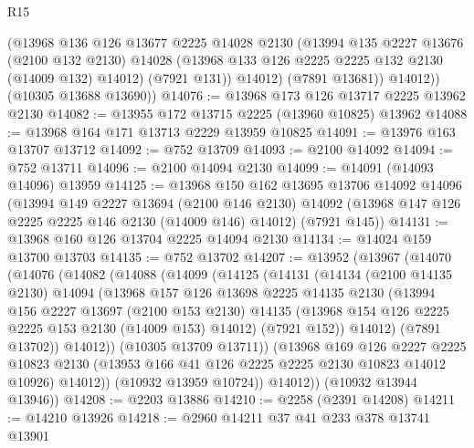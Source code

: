 \begin{lexlean}{R15}
\begin{coremodule}
            (@13968
              @136
              @126
              @13677
              @2225
              @14028
              @2130
              (@13994
                @135
                @2227
                @13676
                (@2100 @132 @2130)
                @14028
                (@13968 @133 @126 @2225 @2225 @132 @2130 (@14009 @132) @14012)
                (@7921 @131))
              @14012)
            (@7891 @13681))
          @14012))
      (@10305 @13688 @13690))
@14076 := @13968 @173 @126 @13717 @2225 @13962 @2130
@14082 := @13955 @172 @13715 @2225 (@13960 @10825) @13962
@14088 := @13968 @164 @171 @13713 @2229 @13959 @10825
@14091 := @13976 @163 @13707 @13712
@14092 := @752 @13709
@14093 := @2100 @14092
@14094 := @752 @13711
@14096 := @2100 @14094 @2130
@14099 := @14091 (@14093 @14096) @13959
@14125 := @13968
    @150
    @162
    @13695
    @13706
    @14092
    @14096
    (@13994
      @149
      @2227
      @13694
      (@2100 @146 @2130)
      @14092
      (@13968 @147 @126 @2225 @2225 @146 @2130 (@14009 @146) @14012)
      (@7921 @145))
@14131 := @13968 @160 @126 @13704 @2225 @14094 @2130
@14134 := @14024 @159 @13700 @13703
@14135 := @752 @13702
@14207 := @13952
    (@13967
      (@14070
        (@14076
          (@14082
            (@14088
              (@14099
                (@14125
                  (@14131
                    (@14134
                      (@2100 @14135 @2130)
                      @14094
                      (@13968
                        @157
                        @126
                        @13698
                        @2225
                        @14135
                        @2130
                        (@13994
                          @156
                          @2227
                          @13697
                          (@2100 @153 @2130)
                          @14135
                          (@13968 @154 @126 @2225 @2225 @153 @2130 (@14009 @153) @14012)
                          (@7921 @152))
                        @14012)
                      (@7891 @13702))
                    @14012))
                (@10305 @13709 @13711))
              (@13968
                @169
                @126
                @2227
                @2225
                @10823
                @2130
                (@13953 @166 @41 @126 @2225 @2225 @2130 @10823 @14012 @10926)
                @14012))
            (@10932 @13959 @10724))
          @14012))
      (@10932 @13944 @13946))
@14208 := @2203 @13886
@14210 := @2258 (@2391 @14208)
@14211 := @14210 @13926
@14218 := @2960 @14211 @37 @41 @233 @378 @13741 @13901

\end{coremodule}
\end{lexlean}
